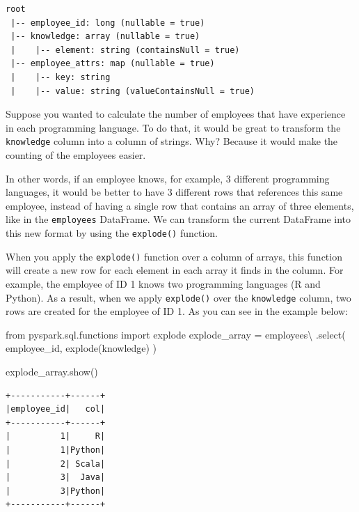 \documentclass[
  11pt,
  letterpaper,
  DIV=11,
  numbers=noendperiod]{scrreprt}
\newenvironment{Shaded}{\begin{snugshade}}{\end{snugshade}}
\newcommand{\ImportTok}[1]{\textcolor[rgb]{0.00,0.46,0.62}{#1}}
\newcommand{\NormalTok}[1]{\textcolor[rgb]{0.00,0.23,0.31}{#1}}
\newcommand{\OperatorTok}[1]{\textcolor[rgb]{0.37,0.37,0.37}{#1}}
\newcommand{\StringTok}[1]{\textcolor[rgb]{0.13,0.47,0.30}{#1}}
\begin{document}
\begin{verbatim}
root
 |-- employee_id: long (nullable = true)
 |-- knowledge: array (nullable = true)
 |    |-- element: string (containsNull = true)
 |-- employee_attrs: map (nullable = true)
 |    |-- key: string
 |    |-- value: string (valueContainsNull = true)
\end{verbatim}

Suppose you wanted to calculate the number of employees that have
experience in each programming language. To do that, it would be great
to transform the \texttt{knowledge} column into a column of strings.
Why? Because it would make the counting of the employees easier.

In other words, if an employee knows, for example, 3 different
programming languages, it would be better to have 3 different rows that
references this same employee, instead of having a single row that
contains an array of three elements, like in the \texttt{employees}
DataFrame. We can transform the current DataFrame into this new format
by using the \texttt{explode()} function.

When you apply the \texttt{explode()} function over a column of arrays,
this function will create a new row for each element in each array it
finds in the column. For example, the employee of ID 1 knows two
programming languages (R and Python). As a result, when we apply
\texttt{explode()} over the \texttt{knowledge} column, two rows are
created for the employee of ID 1. As you can see in the example below:

\begin{Shaded}
\begin{Highlighting}[]
\ImportTok{from}\NormalTok{ pyspark.sql.functions }\ImportTok{import}\NormalTok{ explode}
\NormalTok{explode\_array }\OperatorTok{=}\NormalTok{ employees}\OperatorTok{\textbackslash{}}
\NormalTok{    .select(}
        \StringTok{\textquotesingle{}employee\_id\textquotesingle{}}\NormalTok{,}
\NormalTok{        explode(}\StringTok{\textquotesingle{}knowledge\textquotesingle{}}\NormalTok{)}
\NormalTok{    )}

\NormalTok{explode\_array.show()}
\end{Highlighting}
\end{Shaded}

\begin{verbatim}
+-----------+------+
|employee_id|   col|
+-----------+------+
|          1|     R|
|          1|Python|
|          2| Scala|
|          3|  Java|
|          3|Python|
+-----------+------+
\end{verbatim}
\end{document}
